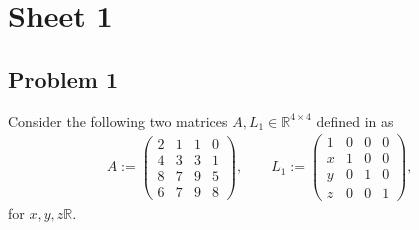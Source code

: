 

\usepackage{scratch}


\maketitle
\tableofcontents
\section{Sheet 1}
\subsection{Problem 1}
Consider the following two matrices $A, L_1 \in \mathbb{R}^{4 \times 4}$
defined in as
\begin{align}
    A :=
    \begin{pmatrix}
        2 & 1 & 1 & 0 \\
        4 & 3 & 3 & 1 \\
        8 & 7 & 9 & 5 \\
        6 & 7 & 9 & 8
    \end{pmatrix},
    \qquad
     L_1 :=
     \begin{pmatrix}
         1 & 0 & 0 & 0\\
         x & 1 & 0 & 0\\
         y & 0 & 1 & 0\\
         z & 0 & 0 & 1
     \end{pmatrix}
,\end{align}
for $x, y, z \mathbb{R}$.

